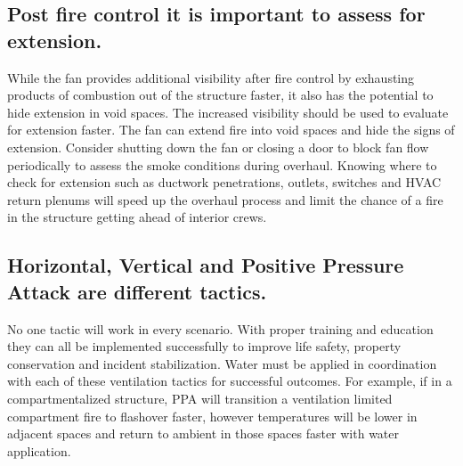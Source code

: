 \documentclass{article}
\begin{document}
\subsection{Post fire control it is important to assess for extension.}
While the fan provides additional visibility after fire control by exhausting products of combustion out of the structure faster, it also has the potential to hide extension in void spaces. The increased visibility should be used to evaluate for extension faster.  The fan can extend fire into void spaces and hide the signs of extension.  Consider shutting down the fan or closing a door to block fan flow periodically to assess the smoke conditions during overhaul.  Knowing where to check for extension such as ductwork penetrations, outlets, switches and HVAC return plenums will speed up the overhaul process and limit the chance of a fire in the structure getting ahead of interior crews.  

\subsection{Horizontal, Vertical and Positive Pressure Attack are different tactics.} No one tactic will work in every scenario.  With proper training and education they can all be implemented successfully to improve life safety, property conservation and incident stabilization.  Water must be applied in coordination with each of these ventilation tactics for successful outcomes.   For example, if in a compartmentalized structure, PPA will transition a ventilation limited compartment fire to flashover faster, however temperatures will be lower in adjacent spaces and return to ambient in those spaces faster with water application.


\newpage

 
\end{document}
